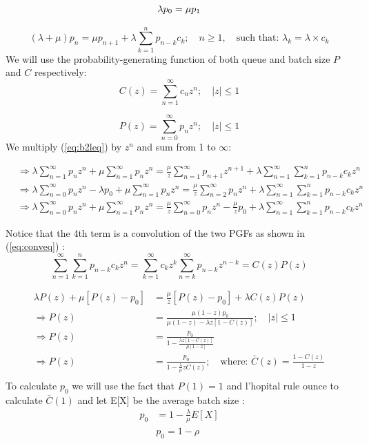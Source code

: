 \documentclass{article}
\begin{document}
\begin{equation}
\lambda p_0 = \mu p_1\\
\label{eq:bleq}
\end{equation}

\begin{equation}
(\lambda + \mu) p_n = \mu p_{n+1} + \lambda \sum_{k=1}^{n} p_{n-k} c_k; \quad n \geq 1, \quad \text{such that: } \lambda_k = \lambda \times c_k
\label{eq:b2leq}
\end{equation}
We will use the probability-generating function of both queue and batch size $P$ and $C$ respectively:
\begin{equation*}
C(z) = \sum_{n=1}^{\infty} c_n z^n; \quad |z| \leq 1
\end{equation*}

\begin{equation*}
P(z) = \sum_{n=0}^{\infty} p_n z^n; \quad |z| \leq 1
\end{equation*}
We multiply (\ref{eq:b2leq}) by $z^n$ and sum from 1 to $\infty$:

\begin{align*}
&\Rightarrow\lambda \sum_{n=1}^{\infty} p_n z^n + \mu \sum_{n=1}^{\infty} p_n z^n = \frac{\mu}{z} \sum_{n=1}^{\infty} p_{n+1} z^{n+1} + \lambda \sum_{n=1}^{\infty} \sum_{k=1}^{n} p_{n-k} c_k z^n\\
&\Rightarrow\lambda \sum_{n=0}^{\infty} p_n z^n - \lambda p_0 + \mu \sum_{n=1}^{\infty} p_n z^n = \frac{\mu}{z} \sum_{n=2}^{\infty} p_{n} z^{n} + \lambda \sum_{n=1}^{\infty} \sum_{k=1}^{n} p_{n-k} c_k z^n\\
&\Rightarrow\lambda \sum_{n=0}^{\infty} p_n z^n + \mu \sum_{n=1}^{\infty} p_n z^n = \frac{\mu}{z} \sum_{n=0}^{\infty} p_{n} z^{n} -\frac{\mu}{z}p_0 + \lambda \sum_{n=1}^{\infty} \sum_{k=1}^{n} p_{n-k} c_k z^n
\end{align*}

Notice that the 4th term is a convolution of the two PGFs as shown in (\ref{eq:conveq})  :
\begin{equation}
\sum_{n=1}^{\infty} \sum_{k=1}^{n} p_{n-k} c_k z^n = \sum_{k=1}^{\infty} c_k z^k \sum_{n=k}^{\infty} p_{n-k} z^{n-k} = C(z)P(z)
\label{eq:conveq}
\end{equation}

\begin{align*}
\lambda P(z) + \mu [P(z) - p_0] &= \frac{\mu}{z} [P(z) - p_0] + \lambda C(z)P(z)\\
\Rightarrow P(z) &= \frac{\mu (1 - z) p_0}{\mu (1 - z) - \lambda z [1 - C(z)]}; \quad |z| \leq 1\\
\Rightarrow P(z) &= \frac{p_0}{1 - \frac{\lambda z [1 - C(z)]}{\mu [1 - z]}}\\
\Rightarrow P(z) &= \frac{p_0}{1 - \frac{\lambda}{\mu} z \bar{C}(z)}; \quad \text{where: } \bar{C}(z) = \frac{1 - C(z)}{1 - z}\\
\end{align*}
To calculate $p_0$ we will use the fact that $ P(1) = 1$ and l'hopital rule ounce to calculate $\bar{C}(1)$ and let E[X] be the average batch size :
\begin{align*}
p_0 &=1 - \frac{\lambda}{\mu} E[X]\\
&\boxed{p_0 = 1 - \rho}
\end{align*}
\end{document}
